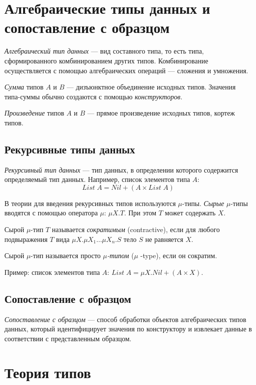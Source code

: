 \section{Алгебраические типы данных и сопоставление с образцом}

\emph{Алгебраический тип данных} — вид составного типа, то есть типа,
сформированного комбинированием других типов.
Комбинирование осуществляется с помощью алгебраических операций — сложения и умножения.

\emph{Сумма} типов $A$ и $B$ — дизъюнктное объединение исходных типов.
Значения типа-суммы обычно создаются с помощью \emph{конструкторов}.

\emph{Произведение} типов $A$ и $B$ — прямое произведение исходных типов,
кортеж типов.

\subsection{Рекурсивные типы данных}
\emph{Рекурсивный тип данных} — тип данных, в определении которого содержится
определяемый тип данных. Например, список элементов типа $A$:
$$ List\;A = Nil + (A \times List\;A) $$

В теории \cite{TAPL} для введения рекурсивных типов используются $\mu$-типы.
\emph{Сырые} $\mu$-типы вводятся с помощью оператора $\mu$: $\mu X . T $.
При этом $T$ может содержать $X$.

\begin{definition}
Сырой $\mu$-тип $T$ называется \emph{сократимым} (contractive),
если для любого подвыражения $T$ вида $ \mu X. \mu X_1 \ldots \mu X_n . S $
тело $S$ не равняется $X$.

Сырой $\mu$-тип называется просто \emph{$\mu$-типом} ($\mu$ -type), если он сократим.
\end{definition}
Пример: список элементов типа $A$: $ List\;A = \mu X . Nil + (A \times X)$.

\subsection{Сопоставление с образцом}

\emph{Сопоставление с образцом} — способ обработки
объектов %
алгебраических типов данных, который идентифицирует значения по конструктору
и извлекает данные в соответствии с представленным образцом.

\section{Теория типов}

